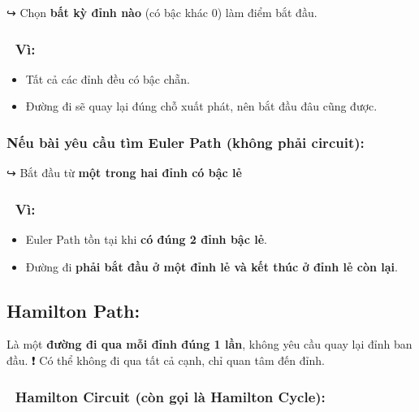\documentclass[11pt,a4paper]{article}
\begin{document}
↪️ Chọn \textbf{bất kỳ đỉnh nào} (có bậc khác 0) làm điểm bắt đầu.

\Needspace{70.0pt}

\subsubsection{\texorpdfstring{\textbf{📌 Vì:}}{📌 Vì:}}

\begin{itemize}
\item
  Tất cả các đỉnh đều có bậc chẵn.
\item
  Đường đi sẽ quay lại đúng chỗ xuất phát, nên bắt đầu đâu cũng được.
\end{itemize}

\Needspace{70.0pt}

\subsubsection{\texorpdfstring{\textbf{Nếu bài yêu cầu tìm Euler Path (không phải circuit):}}{Nếu bài yêu cầu tìm Euler Path (không phải circuit):}}

↪️ Bắt đầu từ \textbf{một trong hai đỉnh có bậc lẻ}

\Needspace{70.0pt}

\subsubsection{\texorpdfstring{\textbf{📌 Vì:}}{📌 Vì:}}

\begin{itemize}
\item
  Euler Path tồn tại khi \textbf{có đúng 2 đỉnh bậc lẻ}.
\item
  Đường đi \textbf{phải bắt đầu ở một đỉnh lẻ và kết thúc ở đỉnh lẻ còn lại}.
\end{itemize}

\Needspace{70.0pt}

\subsection{Hamilton Path:}

Là một \textbf{đường đi qua mỗi đỉnh đúng 1 lần}, không yêu cầu quay lại đỉnh ban đầu. ❗ Có thể không đi qua tất cả cạnh, chỉ quan tâm đến đỉnh.

\Needspace{271.5pt}

\subsubsection{🔹 Hamilton Circuit (còn gọi là Hamilton Cycle):}
\end{document}
